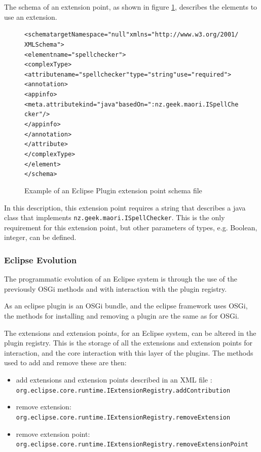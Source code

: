 The schema of an extension point, as shown in figure \ref{eclipseextensionschema}, describes the elements to use an extension.

\begin{figure}[htp]
\begin{center}
\begin{alltt}
<schema targetNamespace="null" xmlns="http://www.w3.org/2001/XMLSchema">
 <element name="spellchecker">
  <complexType>
   <attribute name="spellchecker" type="string" use="required">
    <annotation>
     <appinfo>
      <meta.attribute kind="java" basedOn=":nz.geek.maori.ISpellChecker"/>
     </appinfo>
    </annotation>
   </attribute>
  </complexType>
 </element>
</schema>
\end{alltt}
  \caption[Eclipse Plugin extension point schema]{Example of an Eclipse Plugin extension point schema file}
  \label{eclipseextensionschema}
\end{center}
\end{figure}

In this description, this extension point requires a string that describes a java class that implements \verb+nz.geek.maori.ISpellChecker+.
This is the only requirement for this extension point, but other parameters of types, e.g. Boolean, integer, can be defined.

\subsubsection{Eclipse Evolution}
The programmatic evolution of an Eclipse system is through the use of the previously OSGi methods and with interaction with the plugin registry.

As an eclipse plugin is an OSGi bundle, and the eclipse framework uses OSGi, the methods for installing and removing a plugin are the same as for OSGi.

The extensions and extension points, for an Eclipse system, can be altered in the plugin registry.
This is the storage of all the extensions and extension points for interaction, and the core interaction with this layer of the plugins.
The methods used to add and remove these are then:

\begin{itemize}
  \item add extensions and extension points described in an XML file : \verb+org.eclipse.core.runtime.IExtensionRegistry.addContribution+
  \item remove extension: \verb+org.eclipse.core.runtime.IExtensionRegistry.removeExtension+
  \item remove extension point: \verb+org.eclipse.core.runtime.IExtensionRegistry.removeExtensionPoint+
\end{itemize}

